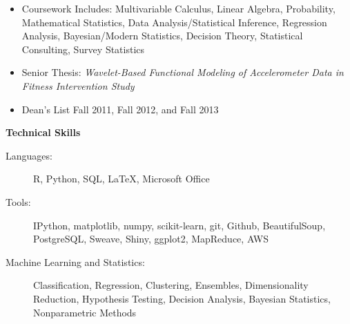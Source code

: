 \documentclass[letterpaper,12pt]{article}
\newcommand{\resitem}[1]{\item #1 \vspace{-2pt}}
\newcommand{\resheading}[1]{{\large \colorbox{mygrey}{\begin{minipage}{\textwidth}{\textbf{#1 \vphantom{p\^{E}}}}\end{minipage}}}}
\begin{document}
				{ \footnotesize
				\begin{itemize}
					\resitem{Coursework Includes: Multivariable Calculus, Linear Algebra, Probability, Mathematical Statistics, Data Analysis/Statistical Inference, Regression Analysis, Bayesian/Modern Statistics, Decision Theory, Statistical Consulting, Survey Statistics}
					\resitem{Senior Thesis: \textit{Wavelet-Based Functional Modeling of Accelerometer Data in Fitness Intervention Study}} 
					\resitem{Dean's List Fall 2011, Fall 2012, and Fall 2013} 
				\end{itemize}


\resheading{Technical Skills}
	\begin{description}
		\item[Languages:] { \footnotesize R, Python, SQL, \LaTeX, Microsoft Office
		}
		\item[Tools:] { \footnotesize IPython, matplotlib, numpy, scikit-learn, git, Github, BeautifulSoup, PostgreSQL, Sweave, Shiny, ggplot2, MapReduce, AWS
		}
		\item[Machine Learning and Statistics:] { \footnotesize Classification, Regression, Clustering, Ensembles, Dimensionality Reduction, Hypothesis Testing, Decision Analysis, Bayesian Statistics, Nonparametric Methods
		}
	\end{description} %

}
\end{document}
